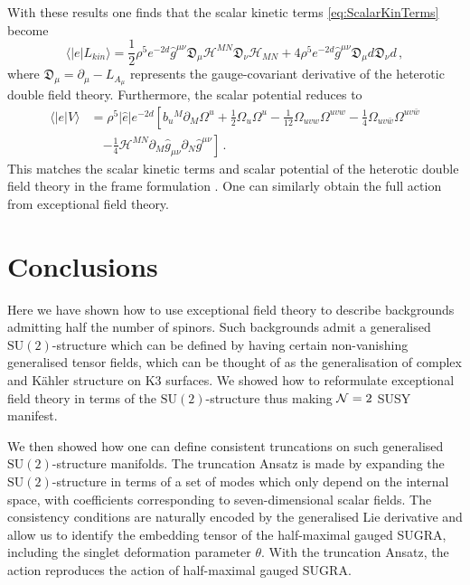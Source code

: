 \documentclass{PoS}
\newcommand{\SU}[1]{\mathrm{SU}( #1 )}
\newcommand{\D}{\mathfrak{D}}
\newcommand{\gH}{\mathcal{H}}
\begin{document}
With these results one finds that the scalar kinetic terms \eqref{eq:ScalarKinTerms} become
\begin{equation}
 \langle |e| L_{kin} \rangle = \frac12 \rho^{5} e^{-2d} \hat{g}^{\mu\nu} \D_\mu \gH^{MN} \D_\nu \gH_{MN} + 4 \rho^{5} e^{-2d} \hat{g}^{\mu\nu} \D_\mu d \D_\nu d \,,
\end{equation}
where $\D_\mu = \partial_\mu - L_{A_\mu}$ represents the gauge-covariant derivative of the heterotic double field theory. Furthermore, the scalar potential reduces to
\begin{equation}
 \begin{split}
  \langle |e| V \rangle &= \rho^5 |\hat{e}| e^{-2d} \left[ b_u{}^M \partial_M \Omega^u + \frac12 \Omega_u \Omega^u - \frac1{12} \Omega_{uvw} \Omega^{uvw} - \frac14 \Omega_{uv\bar{w}} \Omega^{uv\bar{w}} \right. \\
  & \quad \left. - \frac14 \gH^{MN} \partial_M \hat{g}_{\mu\nu} \partial_N \hat{g}^{\mu\nu} \right] \,.
 \end{split}
\end{equation}
This matches the scalar kinetic terms and scalar potential of the heterotic double field theory in the frame formulation \cite{Hohm:2010xe,Hohm:2013nja}. One can similarly obtain the full action from exceptional field theory.

\section{Conclusions} \label{s:Conclusions}
Here we have shown how to use exceptional field theory to describe backgrounds admitting half the number of spinors. Such backgrounds admit a generalised $\SU{2}$-structure which can be defined by having certain non-vanishing generalised tensor fields, which can be thought of as the generalisation of complex and K\"ahler structure on K3 surfaces. We showed how to reformulate exceptional field theory in terms of the $\SU{2}$-structure thus making ${\cal N}=2$ SUSY manifest.

We then showed how one can define consistent truncations on such generalised $\SU{2}$-structure manifolds. The truncation Ansatz is made by expanding the $\SU{2}$-structure in terms of a set of modes which only depend on the internal space, with coefficients corresponding to seven-dimensional scalar fields. The consistency conditions are naturally encoded by the generalised Lie derivative and allow us to identify the embedding tensor of the half-maximal gauged SUGRA, including the singlet deformation parameter $\theta$. With the truncation Ansatz, the action reproduces the action of half-maximal gauged SUGRA.
\end{document}
